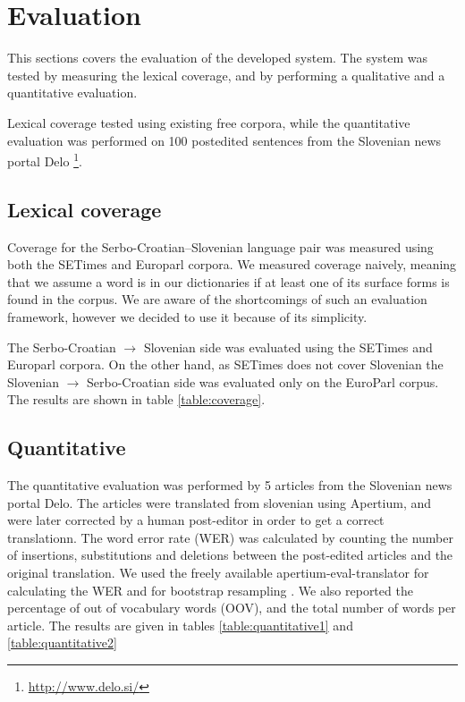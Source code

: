 \section{Evaluation}

This sections covers the evaluation of the developed system. 
The system was tested by measuring the lexical coverage, and by performing
a qualitative and a quantitative evaluation. 

Lexical coverage tested using existing free corpora, 
while the quantitative evaluation was performed on 100 postedited sentences from the Slovenian news portal 
Delo \footnote{\url{http://www.delo.si/}}.


\subsection{Lexical coverage}

Coverage for the Serbo-Croatian--Slovenian language pair was measured using both the SETimes \citep{tyers2010south} and Europarl \citep{koehn05a} corpora. 
We measured coverage naively, meaning that we assume a word is in our 
dictionaries if at least one of its surface forms is found in the corpus. 
We are aware of the shortcomings of such an evaluation framework, 
however we decided to use it because of its simplicity.

The Serbo-Croatian $\rightarrow$ Slovenian side was evaluated using the SETimes and Europarl corpora. On the other hand,
as SETimes does not cover Slovenian
the Slovenian $\rightarrow$ Serbo-Croatian side was evaluated only on the EuroParl corpus. The results are shown in table \ref{table:coverage}.

\subsection{Quantitative}

The quantitative evaluation was performed by 5 articles
from the Slovenian news portal Delo.
The articles were translated from slovenian using Apertium, and were later corrected by a human post-editor in order to get a correct translationn.
The word error rate (WER) was calculated
by counting the number of insertions, substitutions and deletions between the post-edited articles
and the original translation. We used the freely available apertium-eval-translator for calculating the WER 
and for bootstrap resampling \cite{koehn04}.
We also reported the percentage of out of vocabulary words (OOV), and the total number of words per article.
The results are given in tables \ref{table:quantitative1} and \ref{table:quantitative2}

